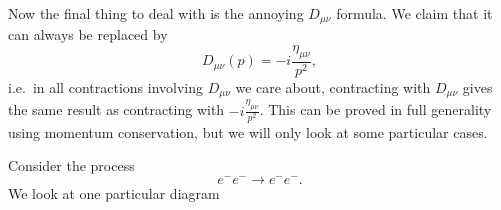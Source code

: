 \documentclass[a4paper]{article}
\begin{document}
Now the final thing to deal with is the annoying $D_{\mu\nu}$ formula. We claim that it can always be replaced by
\[
  D_{\mu\nu}(p) = -i \frac{\eta_{\mu\nu}}{p^2},
\]
i.e.\ in all contractions involving $D_{\mu\nu}$ we care about, contracting with $D_{\mu\nu}$ gives the same result as contracting with $-i \frac{\eta_{\mu\nu}}{p^2}$. This can be proved in full generality using momentum conservation, but we will only look at some particular cases.

\begin{eg}
  Consider the process
  \[
    e^- e^- \to e^- e^-.
  \]
  We look at one particular diagram
  \begin{center}
\end{center}
\end{eg}
\end{document}
